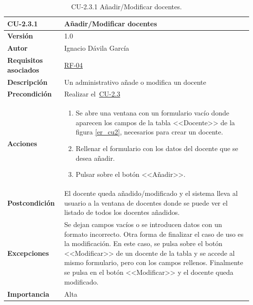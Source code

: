 \begin{table}[p]
\label{table:CU-2.3.1}
	\centering
	\begin{tabularx}{\linewidth}{ p{} p{} }
		\toprule
		\textbf{CU-2.3.1}    & \textbf{Añadir/Modificar docentes}\\
		\toprule
		\textbf{Versión}              & 1.0    \\
		\textbf{Autor}                & Ignacio Dávila García \\
		\textbf{Requisitos asociados} & \hyperref[itm:RF4]{RF-04} \\
		\textbf{Descripción}          & Un administrativo añade o modifica un docente \\
		\textbf{Precondición}         & Realizar el~\hyperref[table:CU-2.3]{CU-2.3} \\
		\textbf{Acciones}             &
		\begin{enumerate}
			\def\labelenumi{\arabic{enumi}.}
			\tightlist
			\item Se abre una ventana con un formulario vacío donde aparecen los campos de la tabla <<Docente>> de la figura \ref{er_cu2}, necesarios para crear un docente.
			\item Rellenar el formulario con los datos del docente que se desea añadir.
			\item Pulsar sobre el botón <<Añadir>>.
		\end{enumerate}\\
		\textbf{Postcondición}        & El docente queda añadido/modificado y el sistema lleva al usuario a la ventana de docentes donde se puede ver el listado de todos los docentes añadidos. \\
		\textbf{Excepciones}          & Se dejan campos vacíos o se introducen datos con un formato incorrecto. Otra forma de finalizar el caso de uso es la modificación. En este caso, se pulsa sobre el botón <<Modificar>> de un docente de la tabla y se accede al mismo formulario, pero con los campos rellenos. Finalmente se pulsa en el botón <<Modificar>> y el docente queda modificado. \\
		\textbf{Importancia}          & Alta \\
		\bottomrule
	\end{tabularx}
	\caption{CU-2.3.1 Añadir/Modificar docentes.}
\end{table}
\FloatBarrier

